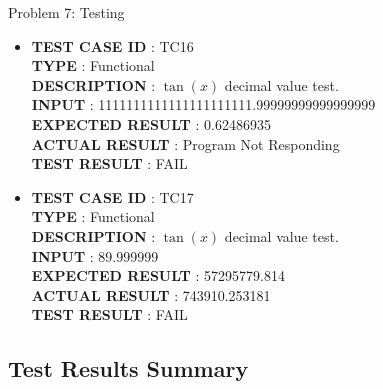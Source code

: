 \documentclass[a4paper,12pt]{article}
\begin{document}
\begin{section}{Problem 7: Testing}
\begin{itemize}
\item \textbf{TEST CASE ID} \hspace{1.25cm} : TC16  \\
\textbf{TYPE } \hspace{3.15cm}  : Functional\\
\textbf{DESCRIPTION }\hspace{1.25cm} : $\tan(x)$ decimal value test. \\
\textbf{INPUT} \hspace{3.05cm} :  1111111111111111111111.99999999999999999 \\
\textbf{EXPECTED RESULT} \hspace{0.01cm} : 0.62486935  \\
\textbf{ACTUAL RESULT} \hspace{0.6cm} : Program Not Responding \\
\textbf{TEST RESULT} \hspace{1.40cm} : FAIL \\	

\item \textbf{TEST CASE ID} \hspace{1.25cm} : TC17 \\
\textbf{TYPE } \hspace{3.15cm}  : Functional\\
\textbf{DESCRIPTION }\hspace{1.25cm} : $\tan(x)$ decimal value test. \\
\textbf{INPUT} \hspace{3.05cm} :  89.999999 \\
\textbf{EXPECTED RESULT} \hspace{0.01cm} : 57295779.814 \\
\textbf{ACTUAL RESULT} \hspace{0.6cm} : 743910.253181 \\
\textbf{TEST RESULT} \hspace{1.40cm} : FAIL \\

	
\end{itemize}

\newpage
\subsection{Test Results Summary}


\end{section}
\end{document}
